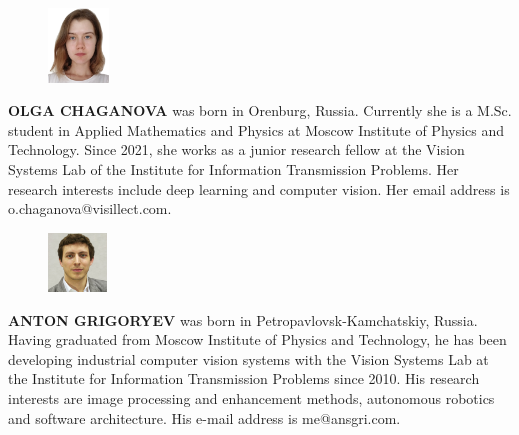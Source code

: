 \documentclass[twocolumn]{ECMS}
\begin{document}
\begin{figure}
    \includegraphics[width=0.145\textwidth]{fig/chaganova.jpg}
\end{figure}
\noindent \textbf{{\MakeUppercase{Olga Chaganova}}} 
\noindent was born in Orenburg, Russia.
Currently she is a M.Sc. student in Applied Mathematics and Physics at Moscow Institute of Physics and Technology.
Since 2021, she works as a junior research fellow at the Vision Systems Lab of the Institute for Information Transmission Problems.
Her research interests include deep learning and computer vision. 
Her email address is o.chaganova@visillect.com.
\\

\begin{figure}
  \includegraphics[width=0.14\textwidth]{fig/grigoryev.jpg}
\end{figure}
\noindent \textbf{{\MakeUppercase{Anton Grigoryev}}} 
\noindent was born in Petropavlovsk-Kamchatskiy, Russia.
Having graduated from Moscow Institute of Physics and Technology, he has been developing industrial computer vision systems with the Vision Systems Lab at the Institute for Information Transmission Problems since 2010.
His research interests are image processing and enhancement methods, autonomous robotics and software architecture.
His e-mail address is me@ansgri.com.
\\
\end{document}
